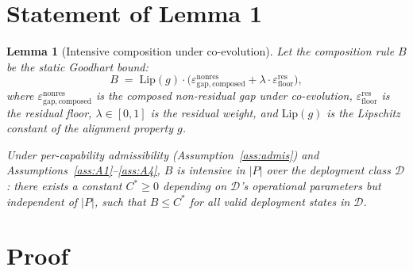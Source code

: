 \documentclass{article}
\newtheorem{lemma}{Lemma}
\newcommand{\epsfloor}{\varepsilon_{\mathrm{floor}}^{\mathrm{res}}}
\newcommand{\epsnonresComposed}{\varepsilon_{\mathrm{gap},\mathrm{composed}}^{\mathrm{nonres}}}
\begin{document}
\section{Statement of Lemma 1}

\begin{lemma}[Intensive composition under co-evolution]
\label{lem:1}
Let the composition rule $B$ be the static Goodhart bound:
\begin{equation}
\label{eq:composition_rule}
  B \;=\; \mathrm{Lip}(g) \cdot \bigl(\epsnonresComposed + \lambda \cdot \epsfloor\bigr),
\end{equation}
where $\epsnonresComposed$ is the composed non-residual gap under
co-evolution, $\epsfloor$ is the residual floor, $\lambda \in [0,1]$
is the residual weight, and $\mathrm{Lip}(g)$ is the Lipschitz
constant of the alignment property $g$.

Under per-capability admissibility (Assumption~\ref{ass:admis}) and
Assumptions~\ref{ass:A1}--\ref{ass:A4}, $B$ is intensive in $|P|$
over the deployment class $\mathcal{D}$: there exists a constant
$C^* \geq 0$ depending on $\mathcal{D}$'s operational parameters
but independent of $|P|$, such that $B \leq C^*$ for all valid
deployment states in $\mathcal{D}$.
\end{lemma}

\section{Proof}
\end{document}
